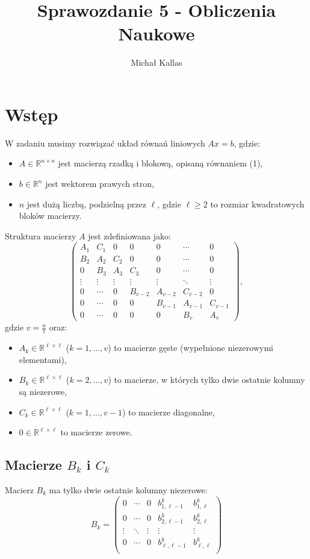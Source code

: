 \documentclass{article}
\title{Sprawozdanie 5 - Obliczenia Naukowe}
\author{Michał Kallas}
\begin{document}
\maketitle

\section{Wstęp}
W zadaniu musimy rozwiązać układ równań liniowych $Ax = b$, gdzie:
\begin{itemize}
    \item $A \in \mathbb{R}^{n \times n}$ jest macierzą rzadką i blokową, opisaną równaniem (1),
    \item $b \in \mathbb{R}^n$ jest wektorem prawych stron,
    \item $n$ jest dużą liczbą, podzielną przez $\ell$, gdzie $\ell \geq 2$ to rozmiar kwadratowych bloków macierzy.
\end{itemize}
Struktura macierzy $A$ jest zdefiniowana jako:
\[
\begin{pmatrix}
A_1 & C_1 & 0 & 0 & 0 & \cdots & 0 \\
B_2 & A_2 & C_2 & 0 & 0 & \cdots & 0 \\
0 & B_3 & A_3 & C_3 & 0 & \cdots & 0 \\
\vdots & \vdots & \vdots & \vdots & \vdots & \ddots & \vdots \\
0 & \cdots & 0 & B_{v-2} & A_{v-2} & C_{v-2} & 0 \\
0 & \cdots & 0 & 0 & B_{v-1} & A_{v-1} & C_{v-1} \\
0 & \cdots & 0 & 0 & 0 & B_v & A_v
\end{pmatrix},
\tag{1}
\]
gdzie $v = \frac{n}{\ell}$ oraz:
\begin{itemize}
    \item $A_k \in \mathbb{R}^{\ell \times \ell}$ ($k = 1, \dots, v$) to macierze gęste (wypełnione niezerowymi elementami),
    \item $B_k \in \mathbb{R}^{\ell \times \ell}$ ($k = 2, \dots, v$) to macierze, w których tylko dwie ostatnie kolumny są niezerowe,
    \item $C_k \in \mathbb{R}^{\ell \times \ell}$ ($k = 1, \dots, v-1$) to macierze diagonalne,
    \item $0 \in \mathbb{R}^{\ell \times \ell}$ to macierze zerowe.
\end{itemize}

\subsection{Macierze $B_k$ i $C_k$}
Macierz $B_k$ ma tylko dwie ostatnie kolumny niezerowe:
\[
B_k = \begin{pmatrix}
0 & \cdots & 0 & b_{1, \ell-1}^{k} & b_{1, \ell}^{k} \\
0 & \cdots & 0 & b_{2, \ell-1}^{k} & b_{2, \ell}^{k} \\
\vdots & \ddots & \vdots & \vdots & \vdots \\
0 & \cdots & 0 & b_{\ell, \ell-1}^{k} & b_{\ell, \ell}^{k} \\
\end{pmatrix}
\]
\end{document}

